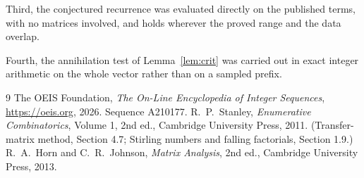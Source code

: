 \documentclass[11pt,a4paper]{article}
\theoremstyle{plain}
\theoremstyle{definition}
\begin{document}
Third, the conjectured recurrence was evaluated directly on the published terms, with no
matrices involved, and holds wherever the proved range and the data overlap.

Fourth, the annihilation test of Lemma~\ref{lem:crit} was carried out in exact integer
arithmetic on the whole vector rather than on a sampled prefix.

\begin{thebibliography}{9}
 The OEIS Foundation, \emph{The On-Line Encyclopedia of Integer
Sequences}, \url{https://oeis.org}, 2026. Sequence A210177.
 R.~P.~Stanley, \emph{Enumerative Combinatorics}, Volume 1, 2nd ed.,
Cambridge University Press, 2011. (Transfer-matrix method, Section 4.7; Stirling numbers and
falling factorials, Section 1.9.)
 R.~A.~Horn and C.~R.~Johnson, \emph{Matrix Analysis}, 2nd ed., Cambridge
University Press, 2013.
\end{thebibliography}
\end{document}
